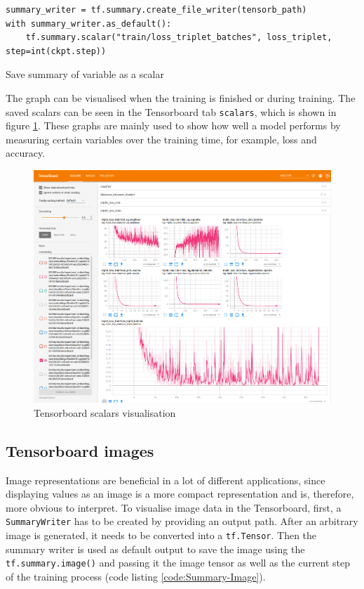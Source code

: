 \begin{code}[H]
\begin{verbatim}
summary_writer = tf.summary.create_file_writer(tensorb_path)
with summary_writer.as_default():
    tf.summary.scalar("train/loss_triplet_batches", loss_triplet, step=int(ckpt.step))
\end{verbatim}
\caption{Save summary of variable as a scalar}
\label{code:Summary-Scalar}
\end{code}
\noindent
The graph can be visualised when the training is finished or during training. The saved scalars can be seen in the Tensorboard tab \texttt{scalars}, which is shown in figure \ref{fig:Tensorboard-Scalars}. These graphs are mainly used to show how well a model performs by measuring certain variables over the training time, for example, loss and accuracy.
\begin{figure}[htb]
	\centering
	\includegraphics[width=0.75\linewidth]{img/Tensorboard_Scalars.png}
	\caption{Tensorboard scalars visualisation}
	\label{fig:Tensorboard-Scalars}
\end{figure}

\subsection{Tensorboard images}
\label{sub:Tensorboard-Images}
Image representations are beneficial in a lot of different applications, since displaying values as an image is a more compact representation and is, therefore, more obvious to interpret. To visualise image data in the Tensorboard, first, a \texttt{SummaryWriter} has to be created by providing an output path. After an arbitrary image is generated, it needs to be converted into a \texttt{tf.Tensor}. Then the summary writer is used as default output to save the image using the \texttt{tf.summary.image()} and passing it the image tensor as well as the current step of the training process (code listing \ref{code:Summary-Image}).

